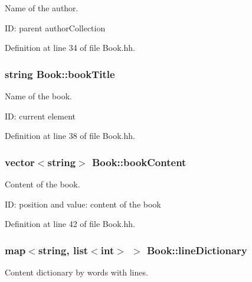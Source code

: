Name of the author. 

ID\+: parent author\+Collection 

Definition at line 34 of file Book.\+hh.

\subsubsection[{\texorpdfstring{book\+Title}{bookTitle}}]{\setlength{\rightskip}{0pt plus 5cm}string Book\+::book\+Title\hspace{0.3cm}{\ttfamily [private]}}\hypertarget{class_book_a111d7b30bddd6166bd09764f050cfee3}{}\label{class_book_a111d7b30bddd6166bd09764f050cfee3}


Name of the book. 

ID\+: current element 

Definition at line 38 of file Book.\+hh.

\subsubsection[{\texorpdfstring{book\+Content}{bookContent}}]{\setlength{\rightskip}{0pt plus 5cm}vector$<$string$>$ Book\+::book\+Content\hspace{0.3cm}{\ttfamily [private]}}\hypertarget{class_book_a62ca3f4431b699fa41384c8bab7ef4fa}{}\label{class_book_a62ca3f4431b699fa41384c8bab7ef4fa}


Content of the book. 

ID\+: position and value\+: content of the book 

Definition at line 42 of file Book.\+hh.

\subsubsection[{\texorpdfstring{line\+Dictionary}{lineDictionary}}]{\setlength{\rightskip}{0pt plus 5cm}map$<$string, list$<$int$>$ $>$ Book\+::line\+Dictionary\hspace{0.3cm}{\ttfamily [private]}}\hypertarget{class_book_a7da5c2f5239458c2ab88576cac8d0a10}{}\label{class_book_a7da5c2f5239458c2ab88576cac8d0a10}


Content dictionary by words with lines. 


